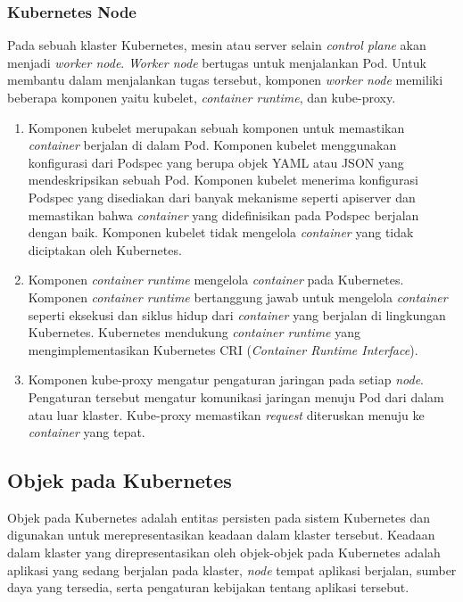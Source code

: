 \subsubsection{Kubernetes Node}

Pada sebuah klaster Kubernetes, mesin atau server selain \emph{control plane} akan menjadi \emph{worker node}.
\emph{Worker node} bertugas untuk menjalankan Pod. Untuk membantu dalam menjalankan tugas tersebut, komponen \emph{worker node}
memiliki beberapa komponen yaitu kubelet, \emph{container runtime}, dan kube-proxy.

\begin{enumerate}
  
  \item Komponen kubelet merupakan sebuah komponen untuk memastikan \emph{container} berjalan di dalam Pod.
    Komponen kubelet menggunakan konfigurasi dari Podspec yang berupa objek YAML atau JSON yang mendeskripsikan
    sebuah Pod. Komponen kubelet menerima konfigurasi Podspec yang disediakan dari banyak mekanisme seperti
    apiserver dan memastikan bahwa \emph{container} yang didefinisikan pada Podspec berjalan dengan baik. Komponen kubelet
    tidak mengelola \emph{container} yang tidak diciptakan oleh Kubernetes.

  \item Komponen \emph{container runtime} mengelola \emph{container} pada Kubernetes. Komponen \emph{container runtime}
    bertanggung jawab untuk mengelola \emph{container} seperti eksekusi dan siklus hidup dari \emph{container} yang berjalan
    di lingkungan Kubernetes. Kubernetes mendukung \emph{container runtime} yang mengimplementasikan Kubernetes
    CRI (\emph{Container Runtime Interface}).

  \item Komponen kube-proxy mengatur pengaturan jaringan pada setiap \emph{node}. Pengaturan tersebut mengatur komunikasi
    jaringan menuju Pod dari dalam atau luar klaster. Kube-proxy memastikan \emph{request} diteruskan menuju ke
    \emph{container} yang tepat.

\end{enumerate}

\subsection{Objek pada Kubernetes}

Objek pada Kubernetes adalah entitas persisten pada sistem Kubernetes dan digunakan untuk
merepresentasikan keadaan dalam klaster tersebut. Keadaan dalam klaster yang direpresentasikan
oleh objek-objek pada Kubernetes adalah aplikasi yang sedang berjalan pada klaster, \emph{node}
tempat aplikasi berjalan, sumber daya yang tersedia, serta pengaturan kebijakan tentang aplikasi
tersebut.

